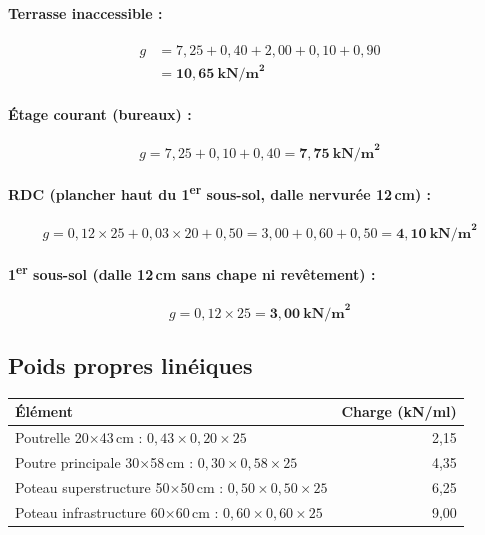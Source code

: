 \paragraph{Terrasse inaccessible :}
\[
\begin{aligned}
  g &= 7{,}25 + 0{,}40 + 2{,}00 + 0{,}10 + 0{,}90 \\
    &= \mathbf{10{,}65~\text{kN/m}^2}
\end{aligned}
\]

\paragraph{Étage courant (bureaux) :}
\[
  g = 7{,}25 + 0{,}10 + 0{,}40 = \mathbf{7{,}75~\text{kN/m}^2}
\]

\paragraph{RDC (plancher haut du 1\textsuperscript{er} sous-sol, dalle nervurée 12\,cm) :}
\[
  g = 0{,}12 \times 25 + 0{,}03 \times 20 + 0{,}50 = 3{,}00 + 0{,}60 + 0{,}50 = \mathbf{4{,}10~\text{kN/m}^2}
\]

\paragraph{1\textsuperscript{er} sous-sol (dalle 12\,cm sans chape ni revêtement) :}
\[
  g = 0{,}12 \times 25 = \mathbf{3{,}00~\text{kN/m}^2}
\]

\subsection{Poids propres linéiques}

\begin{center}
\begin{tabular}{lr}
\toprule
Élément & Charge (kN/ml) \\
\midrule
Poutrelle 20$\times$43\,cm : $0{,}43 \times 0{,}20 \times 25$ & 2,15 \\
Poutre principale 30$\times$58\,cm : $0{,}30 \times 0{,}58 \times 25$ & 4,35 \\
Poteau superstructure 50$\times$50\,cm : $0{,}50 \times 0{,}50 \times 25$ & 6,25 \\
Poteau infrastructure 60$\times$60\,cm : $0{,}60 \times 0{,}60 \times 25$ & 9,00 \\
\bottomrule
\end{tabular}
\end{center}

